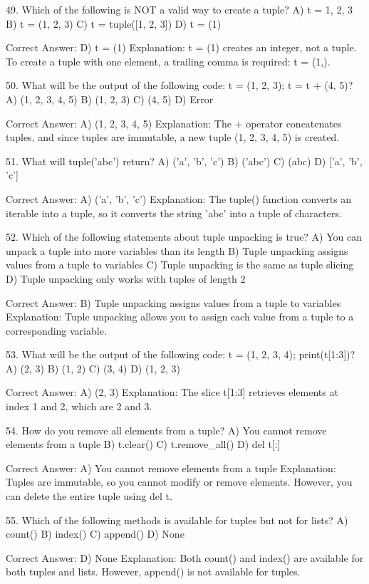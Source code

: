 49. Which of the following is NOT a valid way to create a tuple?
A) t = 1, 2, 3
B) t = (1, 2, 3)
C) t = tuple([1, 2, 3])
D) t = (1)

Correct Answer: D) t = (1)
Explanation: t = (1) creates an integer, not a tuple. To create a tuple with one element, a trailing comma is required: t = (1,).

50. What will be the output of the following code: t = (1, 2, 3); t = t + (4, 5)?
A) (1, 2, 3, 4, 5)
B) (1, 2, 3)
C) (4, 5)
D) Error

Correct Answer: A) (1, 2, 3, 4, 5)
Explanation: The + operator concatenates tuples, and since tuples are immutable, a new tuple (1, 2, 3, 4, 5) is created.

51. What will tuple('abc') return?
A) ('a', 'b', 'c')
B) ('abc')
C) (abc)
D) ['a', 'b', 'c']

Correct Answer: A) ('a', 'b', 'c')
Explanation: The tuple() function converts an iterable into a tuple, so it converts the string 'abc' into a tuple of characters.

52. Which of the following statements about tuple unpacking is true?
A) You can unpack a tuple into more variables than its length
B) Tuple unpacking assigns values from a tuple to variables
C) Tuple unpacking is the same as tuple slicing
D) Tuple unpacking only works with tuples of length 2

Correct Answer: B) Tuple unpacking assigns values from a tuple to variables
Explanation: Tuple unpacking allows you to assign each value from a tuple to a corresponding variable.

53. What will be the output of the following code: t = (1, 2, 3, 4); print(t[1:3])?
A) (2, 3)
B) (1, 2)
C) (3, 4)
D) (1, 2, 3)

Correct Answer: A) (2, 3)
Explanation: The slice t[1:3] retrieves elements at index 1 and 2, which are 2 and 3.

54. How do you remove all elements from a tuple?
A) You cannot remove elements from a tuple
B) t.clear()
C) t.remove_all()
D) del t[:]

Correct Answer: A) You cannot remove elements from a tuple
Explanation: Tuples are immutable, so you cannot modify or remove elements. However, you can delete the entire tuple using del t.

55. Which of the following methods is available for tuples but not for lists?
A) count()
B) index()
C) append()
D) None

Correct Answer: D) None
Explanation: Both count() and index() are available for both tuples and lists. However, append() is not available for tuples.

